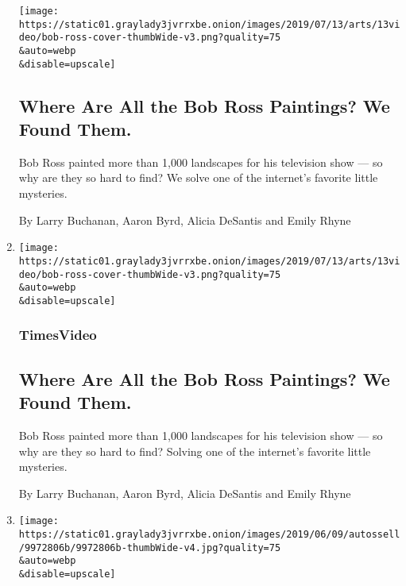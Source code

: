 \begin{enumerate}
  \texttt{[image: https://static01.graylady3jvrrxbe.onion/images/2019/07/13/arts/13video/bob-ross-cover-thumbWide-v3.png?quality=75\\\&auto=webp\\\&disable=upscale]}

  \hypertarget{where-are-all-the-bob-ross-paintings-we-found-them}{%
  \subsection{Where Are All the Bob Ross Paintings? We Found
  Them.}\label{where-are-all-the-bob-ross-paintings-we-found-them}}

  Bob Ross painted more than 1,000 landscapes for his television show
  --- so why are they so hard to find? We solve one of the internet's
  favorite little mysteries.

  By Larry Buchanan, Aaron Byrd, Alicia DeSantis and Emily Rhyne
\item
  \href{/video/arts/100000005865824/bob-ross-paintings-mystery.html}{}

  \texttt{[image: https://static01.graylady3jvrrxbe.onion/images/2019/07/13/arts/13video/bob-ross-cover-thumbWide-v3.png?quality=75\\\&auto=webp\\\&disable=upscale]}

  \hypertarget{timesvideo-5}{%
  \subsubsection{TimesVideo}\label{timesvideo-5}}

  \hypertarget{where-are-all-the-bob-ross-paintings-we-found-them-1}{%
  \subsection{Where Are All the Bob Ross Paintings? We Found
  Them.}\label{where-are-all-the-bob-ross-paintings-we-found-them-1}}

  Bob Ross painted more than 1,000 landscapes for his television show
  --- so why are they so hard to find? Solving one of the internet's
  favorite little mysteries.

  By Larry Buchanan, Aaron Byrd, Alicia DeSantis and Emily Rhyne
\item
  \href{/es/interactive/2019/06/11/universal/sam-kerr-mundial-australia.html}{}

  \texttt{[image: https://static01.graylady3jvrrxbe.onion/images/2019/06/09/autossell/9972806b/9972806b-thumbWide-v4.jpg?quality=75\\\&auto=webp\\\&disable=upscale]}

  \hypertarget{todos-los-goles-de-sam-kerr}{%
}
\end{enumerate}

